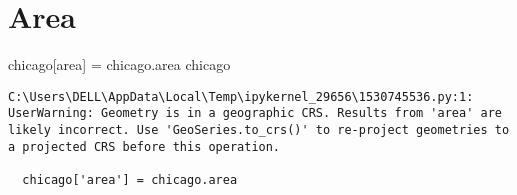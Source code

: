 \documentclass[
  letterpaper,
  DIV=11,
  numbers=noendperiod]{scrreprt}
\newenvironment{Shaded}{\begin{snugshade}}{\end{snugshade}}
\newcommand{\NormalTok}[1]{\textcolor[rgb]{0.00,0.23,0.31}{#1}}
\newcommand{\OperatorTok}[1]{\textcolor[rgb]{0.37,0.37,0.37}{#1}}
\newcommand{\StringTok}[1]{\textcolor[rgb]{0.13,0.47,0.30}{#1}}
\begin{document}
\hypertarget{area}{%
\section{Area}\label{area}}

\begin{Shaded}
\begin{Highlighting}[]
\NormalTok{chicago[}\StringTok{\textquotesingle{}area\textquotesingle{}}\NormalTok{] }\OperatorTok{=}\NormalTok{ chicago.area}
\NormalTok{chicago}
\end{Highlighting}
\end{Shaded}

\begin{verbatim}
C:\Users\DELL\AppData\Local\Temp\ipykernel_29656\1530745536.py:1: UserWarning: Geometry is in a geographic CRS. Results from 'area' are likely incorrect. Use 'GeoSeries.to_crs()' to re-project geometries to a projected CRS before this operation.

  chicago['area'] = chicago.area
\end{verbatim}
\end{document}
